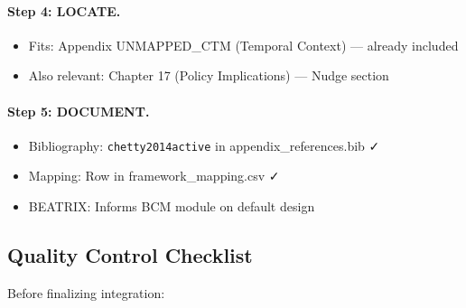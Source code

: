 \paragraph{Step 4: LOCATE.}
\begin{itemize}
  \item Fits: Appendix UNMAPPED_CTM (Temporal Context) --- already included
  \item Also relevant: Chapter 17 (Policy Implications) --- Nudge section
\end{itemize}

\paragraph{Step 5: DOCUMENT.}
\begin{itemize}
  \item Bibliography: \texttt{chetty2014active} in appendix\_references.bib ✓
  \item Mapping: Row in framework\_mapping.csv ✓
  \item BEATRIX: Informs BCM module on default design
\end{itemize}

\subsection{Quality Control Checklist}

Before finalizing integration:

\begin{center}
\end{center}

